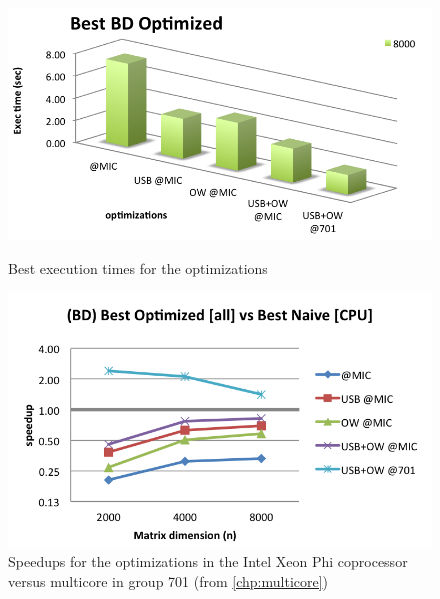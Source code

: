 \documentclass[../thesis]{subfiles}
\begin{document}
	\begin{figure}[t]
		\begin{minipage}{0.48\textwidth}
			\centering
			\includegraphics[width=\textwidth]{assets/images/mic/optims/best.png}
			\captionsetup{font=small}
			\caption{Best execution times for the optimizations}
			\label{fig:mic:optims:best:times}
		\end{minipage}
		\hfill
		\begin{minipage}{0.48\textwidth}
			\centering
			\includegraphics[width=\textwidth]{assets/images/mic/optims/best-speedup.png}
			\captionsetup{font=small}
			\caption[Speedups for the optimizations in MIC versus in CPU]{Speedups for the optimizations in the Intel Xeon Phi coprocessor versus multicore in group 701 (from \cref{chp:multicore})}
			\label{fig:mic:optims:best:speedup}
		\end{minipage}
	\end{figure}
\end{document}
